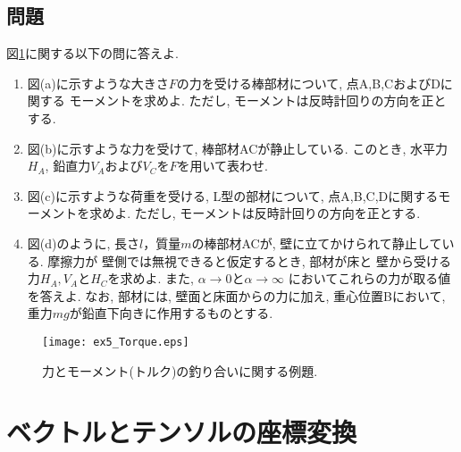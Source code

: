 \documentclass[10pt,a4j]{jbook}
\begin{document}
\subsection{問題}
図\ref{fig:ex5_Torque}に関する以下の問に答えよ.
\begin{enumerate}
\item
図(a)に示すような大きさ$F$の力を受ける棒部材について, 点A,B,CおよびDに関する
モーメントを求めよ. ただし, モーメントは反時計回りの方向を正とする. 
\item
図(b)に示すような力を受けて, 棒部材ACが静止している. このとき, 水平力$H_A$, 
鉛直力$V_A$および$V_C$を$F$を用いて表わせ. 
\item
図(c)に示すような荷重を受ける, L型の部材について, 点A,B,C,Dに関するモーメントを求めよ. 
ただし, モーメントは反時計回りの方向を正とする. 
\item
図(d)のように, 長さ$l$，質量$m$の棒部材ACが, 壁に立てかけられて静止している. 
摩擦力が 壁側では無視できると仮定するとき, 部材が床と
壁から受ける力$H_A, V_A$と$H_C$を求めよ. また, $\alpha\rightarrow 0$と$\alpha \rightarrow \infty$
においてこれらの力が取る値を答えよ. なお, 部材には, 壁面と床面からの力に加え, 
重心位置Bにおいて, 重力$mg$が鉛直下向きに作用するものとする. 
\end{enumerate}
\begin{figure}[h]
	\begin{center}
	\texttt{[image: ex5\_Torque.eps]} 
	\end{center}
	\caption{力とモーメント(トルク)の釣り合いに関する例題.} 
	\label{fig:ex5_Torque}
\end{figure}
\section{ベクトルとテンソルの座標変換}
\end{document}
